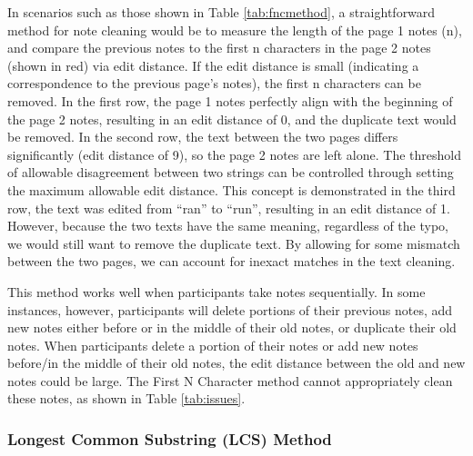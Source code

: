 \documentclass[print]{nuthesis}
\begin{document}
In scenarios such as those shown in Table \ref{tab:fncmethod}, a straightforward method for note cleaning would be to measure the length of the page 1 notes (n), and compare the previous notes to the first n characters in the page 2 notes (shown in red) via edit distance.
If the edit distance is small (indicating a correspondence to the previous page's notes), the first n characters can be removed.
In the first row, the page 1 notes perfectly align with the beginning of the page 2 notes, resulting in an edit distance of 0, and the duplicate text would be removed.
In the second row, the text between the two pages differs significantly (edit distance of 9), so the page 2 notes are left alone.
The threshold of allowable disagreement between two strings can be controlled through setting the maximum allowable edit distance.
This concept is demonstrated in the third row, the text was edited from ``ran'' to ``run'', resulting in an edit distance of 1.
However, because the two texts have the same meaning, regardless of the typo, we would still want to remove the duplicate text.
By allowing for some mismatch between the two pages, we can account for inexact matches in the text cleaning.

This method works well when participants take notes sequentially.
In some instances, however, participants will delete portions of their previous notes, add new notes either before or in the middle of their old notes, or duplicate their old notes.
When participants delete a portion of their notes or add new notes before/in the middle of their old notes, the edit distance between the old and new notes could be large.
The First N Character method cannot appropriately clean these notes, as shown in Table \ref{tab:issues}.

\hypertarget{longest-common-substring-lcs-method}{%
\subsubsection{Longest Common Substring (LCS) Method}\label{longest-common-substring-lcs-method}}
\end{document}
